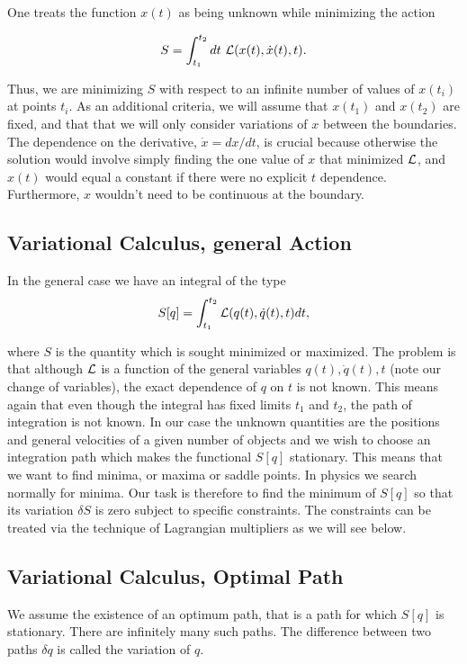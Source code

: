 \documentclass[%
oneside,                 %
final,                   %
10pt]{article}
\begin{document}
One treats the function $x(t)$ as being unknown while minimizing the action

\[
S=\int_{t_1}^{t_2}dt~{\cal L}(x(t),\dot{x}(t),t).
\]

Thus, we are minimizing $S$ with respect to an infinite number of
values of $x(t_i)$ at points $t_i$. As an additional criteria, we will
assume that $x(t_1)$ and $x(t_2)$ are fixed, and that that we will
only consider variations of $x$ between the boundaries. The dependence
on the derivative, $\dot{x}=dx/dt$, is crucial because otherwise the
solution would involve simply finding the one value of $x$ that
minimized ${\cal L}$, and $x(t)$ would equal a constant if there were no
explicit $t$ dependence. Furthermore, $x$ wouldn't need to be
continuous at the boundary.

\subsection*{Variational Calculus, general Action}

In the general case we have an integral of the type
\[ 
S[q]= \int_{t_1}^{t_2} {\cal L}(q(t),\dot{q}(t),t)dt,
\]

where $S$ is the quantity which is sought minimized or maximized.  The
problem is that although ${\cal L}$  is a function of the general variables
$q(t),\dot{q}(t),t$ (note our change of variables), the exact dependence of $q$ on $t$ is not known.
This means again that even though the integral has fixed limits $t_1$
and $t_2$, the path of integration is not known. In our case the unknown
quantities are the positions and general velocities of a given number
of objects and we wish to choose an integration path which makes the
functional $S[q]$ stationary. This means that we want to find minima,
or maxima or saddle points. In physics we search normally for minima.
Our task is therefore to find the minimum of $S[q]$ so that its
variation $\delta S$ is zero subject to specific constraints.  The
constraints can be treated via the technique of Lagrangian multipliers
as we will see below.

\subsection*{Variational Calculus, Optimal Path}

We assume the existence of an optimum path, that is a path for which
$S[q]$ is stationary. There are infinitely many such paths.  The
difference between two paths $\delta q$ is called the variation of
$q$.
\end{document}
